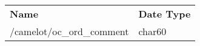 \begin{tabularx}{\textwidth}{lX}
	\rowcolor{heading}\textbf{Name} & \textbf{Date Type} \\
	/camelot/oc\_ord\_comment & char60 \\
\end{tabularx}